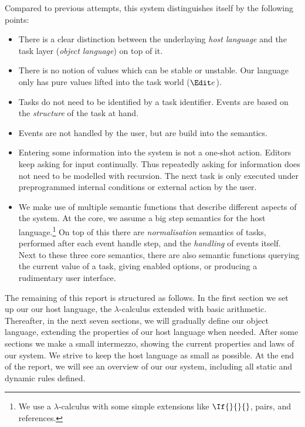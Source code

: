 Compared to previous attempts,
this system distinguishes itself by the following points:
\begin{itemize}
  \item
    There is a clear distinction between the underlaying \emph{host language}
    and the task layer (\emph{object language}) on top of it.
  \item
    There is no notion of values which can be stable or unstable.
    Our language only has pure values lifted into the task world ($\Edit e$).
  \item
    Tasks do not need to be identified by a task identifier.
    Events are based on the \emph{structure} of the task at hand.
  \item
    Events are not handled by the user, but are build into the semantics.
  \item
    Entering some information into the system is not a one-shot action.
    Editors keep asking for input continually.
    Thus repeatedly asking for information does not need to be modelled with recursion.
    The next task is only executed under preprogrammed internal conditions or external action by the user.
  \item
    We make use of multiple semantic functions that describe different aspects of the system.
    At the core, we assume a big step semantics for the host language.\footnote{
      We use a $\lambda$-calculus with some simple extensions like $\If{}{}{}$, pairs, and references.}
    On top of this there are \emph{normalisation} semantics of tasks,
    performed after each event handle step,
    and the \emph{handling} of events itself.
    Next to these three core semantics,
    there are also semantic functions querying the current value of a task,
    giving enabled options,
    or producing a rudimentary user interface.
\end{itemize}

The remaining of this report is structured as follows.
In the first section we set up our our host language,
the $\lambda$-calculus extended with basic arithmetic.
Thereafter, in the next seven sections, we will gradually define our object language,
extending the properties of our host language when needed.
After some sections we make a small intermezzo,
showing the current properties and laws of our system.
We strive to keep the host language as small as possible.
At the end of the report,
we will see an overview of our our system,
including all static and dynamic rules defined.
